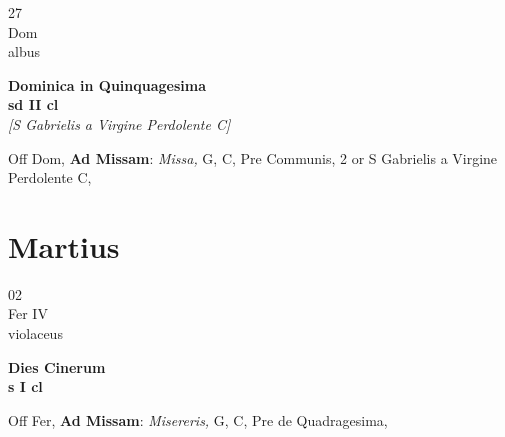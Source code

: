 \documentclass[10pt, openany]{book}
\begin{document}
        \begin{center}
            \begin{minipage}{3.5in}
                \vspace{2em}
                \begin{minipage}{0.5in}
                    {\Huge 27} \\
                    {\normalsize Dom} \\
                    {\normalsize albus}
                \end{minipage}
                \begin{minipage}{3.0in}
                    \textbf{ \large Dominica in Quinquagesima \\
                    \textnormal{\normalsize sd II cl}} \\ \textit{[S Gabrielis a Virgine Perdolente C]} \\ 
                \end{minipage}
                \begin{justify}Off Dom, \textbf{Ad Missam}: \textit{Missa,} G, C, Pre Communis, 2 or S Gabrielis a Virgine Perdolente C,  
                \end{justify}
            \end{minipage}
        \end{center}
    
        \chapter{Martius}
                        
        \begin{center}
            \begin{minipage}{3.5in}
                \vspace{2em}
                \begin{minipage}{0.5in}
                    {\Huge 02} \\
                    {\normalsize Fer IV} \\
                    {\normalsize violaceus}
                \end{minipage}
                \begin{minipage}{3.0in}
                    \textbf{ \large Dies Cinerum \\
                    \textnormal{\normalsize s I cl}} \\ 
                \end{minipage}
                \begin{justify}Off Fer, \textbf{Ad Missam}: \textit{Misereris,} G, C, Pre de Quadragesima,  
                \end{justify}
            \end{minipage}
        \end{center}
    
\end{document}
